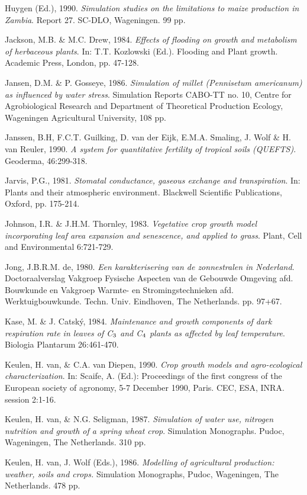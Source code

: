 Huygen (Ed.), 1990. {\it Simulation studies on the limitations to maize production in Zambia\/}. Report 27.
SC-DLO, {\nobreak}Wageningen. 99 pp.

Jackson, M.B. \& M.C. Drew, 1984. {\it Effects of flooding on growth and metabolism of herbaceous
plants\/}. In: T.T. Kozlowski (Ed.). Flooding and Plant growth. Academic Press, London, pp. 47-128.

Jansen, D.M. \& P. Gosseye, 1986. {\it Simulation of millet (Pennisetum americanum) as influenced by
water stress\/}. Simulation Reports CABO-TT no. 10, Centre for Agrobiological Research and
Department of Theoretical Production Ecology, Wageningen Agricultural University, 108 pp.

Janssen, B.H, F.C.T. Guilking, D. van der Eijk, E.M.A. Smaling, J. Wolf \& H. van Reuler, 1990.
{\it A system for quantitative fertility of tropical soils (QUEFTS)\/}. Geoderma, 46:299-318.

Jarvis, P.G., 1981. {\it Stomatal conductance, gaseous exchange and transpiration\/}. In: Plants and their
atmospheric environment. Blackwell Scientific Publications, Oxford, pp. 175-214.

Johnson, I.R. \& J.H.M. Thornley, 1983. {\it Vegetative crop growth model incorporating leaf area
expansion and senescence, and applied to grass\/}. Plant, Cell and Environmental 6:721-729.

Jong, J.B.R.M. de, 1980. {\it Een karakterisering van de zonnestralen in Nederland\/}. Doctoraalverslag
Vakgroep Fysische Aspecten van de Gebouwde Omgeving afd. Bouwkunde en Vakgroep Warmte-
en Stromingstechnieken afd. Werktuigbouwkunde. Techn. Univ. Eindhoven, The Netherlands. pp.
97+67.

\bigskip
Kase, M. \& J. Catsk\'{y}, 1984. {\it Maintenance and growth components of dark respiration rate in leaves
of C$_{{\rm 3}}$ and C$_{{\rm 4}}$ plants as affected by leaf temperature\/}. Biologia Plantarum 26:461-470.

Keulen, H. van, \& C.A. van Diepen, 1990. {\it Crop growth models and agro-ecological charac\-terizati\-on\/}. In: Scaife, A. (Ed.): Proceedings of the first con\-gress of the European so\-cie\-ty of agronomy, 5-7
December 1990, Paris. CEC, ESA, INRA. session 2:1-16.

Keulen, H. van, \& N.G. Seligman, 1987. {\it Simulation of water use, nitrogen nutrition and growth of
a spring wheat crop\/}. Simulation Monographs. Pudoc, Wageningen, The Netherlands. 310 pp.

Keulen, H. van, J. Wolf (Eds.), 1986. {\it Modelling of agricultural production: weather, soils and
crops.\/} Simulation Monographs, Pudoc, Wageningen, The Netherlands. 478 pp. 

